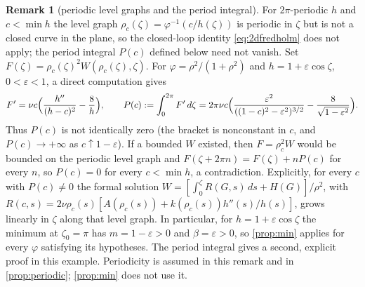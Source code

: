 \documentclass[11pt]{article}
\theoremstyle{definition}
\newtheorem{remark}[theorem]{Remark}
\begin{document}
\begin{remark}[periodic level graphs and the period integral]\label{rem:drift}
For $2\pi$-periodic $h$ and $c<\min h$ the level graph
$\rho_c(\zeta)=\varphi^{-1}(c/h(\zeta))$ is
periodic in $\zeta$ but is not a closed curve in the plane, so the closed-loop
identity \eqref{eq:2dfredholm} does not apply; the period integral $P(c)$
defined below need not vanish. Set
$F(\zeta)=\rho_c(\zeta)^2W(\rho_c(\zeta),\zeta)$. For
$\varphi=\rho^2/(1+\rho^2)$ and $h=1+\varepsilon\cos\zeta$, $0<\varepsilon<1$,
a direct computation gives
\begin{equation}
F'=\nu c\Bigl(\frac{h''}{(h-c)^2}-\frac{8}{h}\Bigr),\qquad
P(c):=\int_0^{2\pi}F'\,d\zeta
=2\pi\nu c\Bigl(\frac{\varepsilon^2}{((1-c)^2-\varepsilon^2)^{3/2}}
-\frac{8}{\sqrt{1-\varepsilon^2}}\Bigr).
\end{equation}
Thus $P(c)$ is not identically zero (the bracket is nonconstant in $c$, and
$P(c)\to+\infty$ as $c\uparrow1-\varepsilon$). If a bounded $W$ existed, then
$F=\rho_c^2W$ would be bounded on the periodic level graph and
$F(\zeta+2\pi n)=F(\zeta)+nP(c)$ for every $n$, so $P(c)=0$ for every
$c<\min h$, a contradiction. Explicitly, for every $c$ with $P(c)\neq0$ the formal solution
$W=[\int_0^\zeta R(G,s)\,ds+H(G)]/\rho^2$, with
$R(c,s)=2\nu\rho_c(s)[A(\rho_c(s))+k(\rho_c(s))h''(s)/h(s)]$, grows linearly in
$\zeta$ along that level graph. In particular, for $h=1+\varepsilon\cos\zeta$
the minimum at $\zeta_0=\pi$ has $m=1-\varepsilon>0$ and $\beta=\varepsilon>0$,
so \cref{prop:min} applies for every $\varphi$ satisfying its hypotheses. The
period integral gives a second, explicit proof in this example. Periodicity is
assumed in this remark and in \cref{prop:periodic}; \cref{prop:min} does not
use it.
\end{remark}
\end{document}
